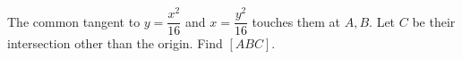 The common tangent to $y=\dfrac{x^2}{16}$ and $x=\dfrac{y^2}{16}$ touches them at $A,B$. Let $C$ be their intersection other than the origin. Find $[ABC]$.
